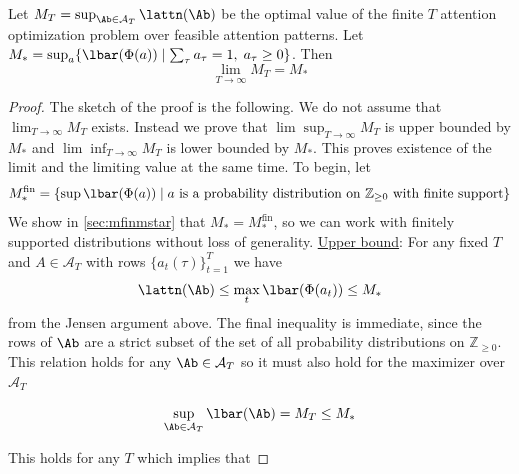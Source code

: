 \documentclass{article}
\begin{document}
\begin{theorem}
Let $M_T = \sup_{\Ab \in \mathcal{A}_T} \lattn(\Ab)$ be the optimal value of the finite $T$ attention optimization problem over feasible attention patterns. Let $M_\ast = \sup_a\{\lbar(\Phi(a)) \mid \sum_{\tau} a_\tau = 1 ,\; a_\tau \ge 0\}$. Then 
\begin{equation}
    \lim_{T \to \infty} M_T = M_{\ast}
\end{equation}
\end{theorem}

\begin{proof}
    The sketch of the proof is the following. We do not assume that $\lim_{T \to \infty}M_T$ exists. Instead we prove that $\lim\sup_{T\to \infty} M_T$ is upper bounded by $M_\ast$ and $\lim\inf_{T\to \infty} M_T$ is lower bounded by $M_\ast$. This proves existence of the limit and the limiting value at the same time. To begin, let
    \begin{equation}
    M_\ast^{\text{fin}} = \{\sup\lbar(\Phi(a)) \mid a \textrm{ is a probability distribution on $\mathbb{Z}_{\ge0}$ with finite support}\}
    \end{equation}
    We show in \ref{sec:mfinmstar} that $M_\ast = M_\ast^{\text{fin}}$, so we can work with finitely supported distributions without loss of generality. 
\newline
\newline
\underline{Upper bound}:
\newline
\newline
For any fixed $T$ and $A \in \mathcal{A}_T$ with rows $\{a_t(\tau)\}_{t=1}^T$ we have 
\begin{equation}
    \lattn(\Ab) \le \max_t \lbar(\Phi(a_t)) \le M_\ast
\end{equation}
from the Jensen argument above. The final inequality is immediate, since the rows of $\Ab$ are a strict subset of the set of all probability distributions on $\mathbb{Z}_{\ge0}$. This relation holds for any $\Ab \in\mathcal{A}_T$ so it must also hold for the maximizer over $\mathcal{A}_T$

\begin{equation}
    \sup_{\Ab \in \mathcal{A}_T} \lbar(\Ab) = M_T \le M_\ast
\end{equation}

This holds for any $T$ which implies that 


\end{proof}
\end{document}
